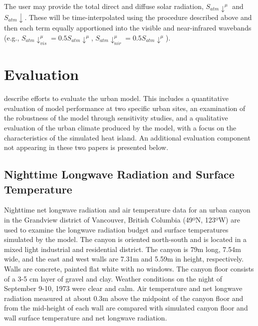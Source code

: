 \documentclass[12pt,authoryear]{elsarticle}
\numberwithin{equation}{section} %
\begin{document}
The user may provide the total direct and diffuse solar radiation, $S_{atm}\downarrow^{\mu}$ and $S_{atm}\downarrow$. These will be time-interpolated using the procedure described above and then each term equally apportioned into the visible and near-infrared wavebands (e.g., $S_{atm}\downarrow_{vis}^{\mu}=0.5S_{atm}\downarrow^{\mu}$, $S_{atm}\downarrow_{nir}^{\mu}=0.5S_{atm}\downarrow^{\mu}$).

\section{Evaluation}
\label{sec:evaluation}
\cite{OLESONETAL08J.Appl.Meteorol.Climatol.a,OLESONETAL08J.Appl.Meteorol.Climatol.b} describe efforts to evaluate the urban model. This includes a quantitative evaluation of model performance at two specific urban sites, an examination of the robustness of the model through sensitivity studies, and a qualitative evaluation of the urban climate produced by the model, with a focus on the characteristics of the simulated heat island. An additional evaluation component not appearing in these two papers is presented below.
\subsection{Nighttime Longwave Radiation and Surface Temperature}
%
Nighttime net longwave radiation and air temperature data for an urban canyon in the Grandview district of Vancouver, British Columbia (49ºN, 123ºW) \citep{nunezLongwaveRadiativeFlux1976,nunezEnergyBalanceUrban1977} are used to examine the longwave radiation budget and surface temperatures simulated by the model. The canyon is oriented north-south and is located in a mixed light industrial and residential district. The canyon is 79m long, 7.54m wide, and the east and west walls are 7.31m and 5.59m in height, respectively. Walls are concrete, painted flat white with no windows. The canyon floor consists of a 3-5 cm layer of gravel and clay. Weather conditions on the night of September 9-10, 1973 were clear and calm. Air temperature and net longwave radiation measured at about 0.3m above the midpoint of the canyon floor and from the mid-height of each wall are compared with simulated canyon floor and wall surface temperature and net longwave radiation.
\end{document}
